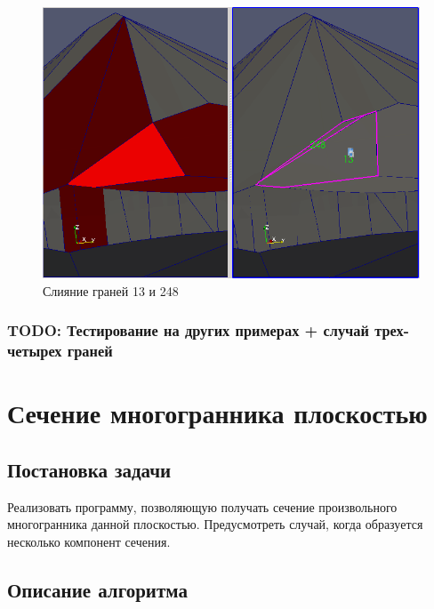 \documentclass[a4paper,12pt, titlepage]{article}
\begin{document}
\begin{flushleft}
  \begin{figure}[h]
    \includegraphics[clip, width=13cm]{polyhedron-2010-11-25/13-248.png}
    \caption{Слияние граней 13 и 248}\label{poly1-3}
  \end{figure}
\end{flushleft}

\subsubsection{TODO: Тестирование на других примерах + случай трех-четырех граней}




\section{Сечение многогранника плоскостью}

\subsection{Постановка задачи}
\begin{flushleft}
	Реализовать программу, позволяющую получать сечение произвольного многогранника
	данной плоскостью. Предусмотреть случай, когда образуется несколько компонент сечения.
\end{flushleft}

\subsection{Описание алгоритма}
\end{document}
